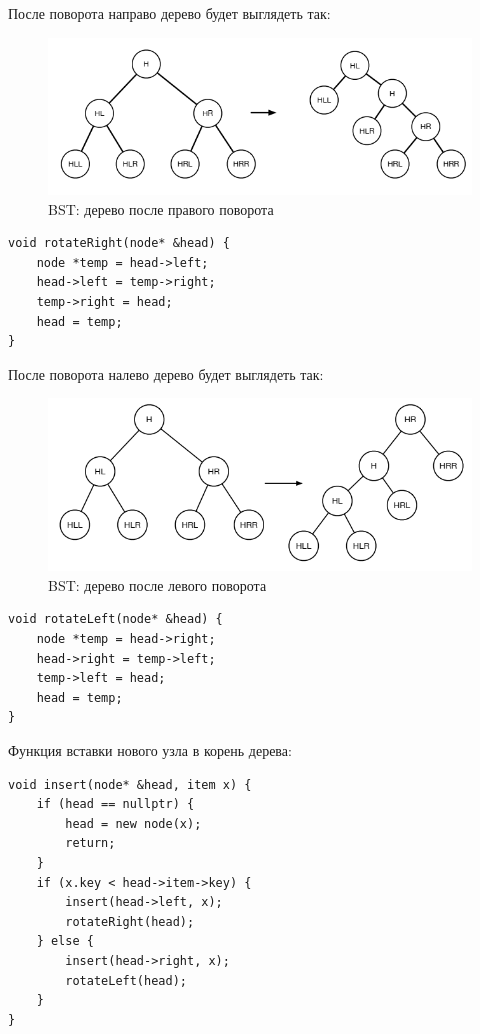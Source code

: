 \documentclass{beamer}
\begin{document}
\begin{frame}[fragile]
	После поворота направо дерево будет выглядеть так:
	\begin{figure}[h]
		\centering
		\includegraphics[scale=0.4]{images/lec07-pic13.png}
		\caption{BST: дерево после правого поворота}
	\end{figure}
	\begin{verbatim}
void rotateRight(node* &head) {
	node *temp = head->left;
	head->left = temp->right;
	temp->right = head;
	head = temp;
}
	\end{verbatim}
\end{frame}

\begin{frame}[fragile]
	После поворота налево дерево будет выглядеть так:
	\begin{figure}[h]
		\centering
		\includegraphics[scale=0.4]{images/lec07-pic14.png}
		\caption{BST: дерево после левого поворота}
	\end{figure}
	\begin{verbatim}
void rotateLeft(node* &head) {
	node *temp = head->right;
	head->right = temp->left;
	temp->left = head;
	head = temp;
}
	\end{verbatim}
\end{frame}

\begin{frame}[fragile]
	Функция вставки нового узла в корень дерева:
	\begin{verbatim}
void insert(node* &head, item x) {
	if (head == nullptr) {
		head = new node(x);
		return;
	}
	if (x.key < head->item->key) {
		insert(head->left, x);
		rotateRight(head);
	} else {
		insert(head->right, x);
		rotateLeft(head);
	}
}	
	\end{verbatim}
\end{frame}
\end{document}

